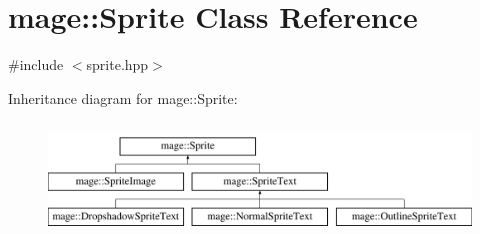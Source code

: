 \hypertarget{classmage_1_1_sprite}{}\section{mage\+:\+:Sprite Class Reference}
\label{classmage_1_1_sprite}


{\ttfamily \#include $<$sprite.\+hpp$>$}

Inheritance diagram for mage\+:\+:Sprite\+:\begin{figure}[H]
\begin{center}
\leavevmode
\includegraphics[height=3.000000cm]{classmage_1_1_sprite}
\end{center}
\end{figure}
